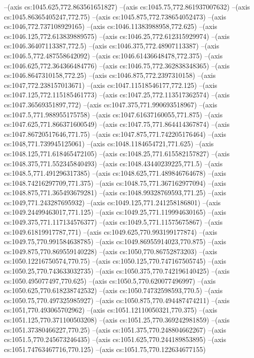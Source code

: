 --(axis cs:1045.625,772.863561651827)
--(axis cs:1045.75,772.861937007632)
--(axis cs:1045.86365405247,772.75)
--(axis cs:1045.875,772.738654052473)
--(axis cs:1046,772.737108929165)
--(axis cs:1046.11383988958,772.625)
--(axis cs:1046.125,772.613839889575)
--(axis cs:1046.25,772.612315929974)
--(axis cs:1046.36407113387,772.5)
--(axis cs:1046.375,772.48907113387)
--(axis cs:1046.5,772.487558642092)
--(axis cs:1046.61436648478,772.375)
--(axis cs:1046.625,772.364366484776)
--(axis cs:1046.75,772.362838348365)
--(axis cs:1046.8647310158,772.25)
--(axis cs:1046.875,772.2397310158)
--(axis cs:1047,772.238157013671)
--(axis cs:1047.11518546177,772.125)
--(axis cs:1047.125,772.115185461773)
--(axis cs:1047.25,772.113517362574)
--(axis cs:1047.36569351897,772)
--(axis cs:1047.375,771.990693518967)
--(axis cs:1047.5,771.988955175758)
--(axis cs:1047.61637160055,771.875)
--(axis cs:1047.625,771.866371600549)
--(axis cs:1047.75,771.864414367874)
--(axis cs:1047.86720517646,771.75)
--(axis cs:1047.875,771.742205176464)
--(axis cs:1048,771.739945125061)
--(axis cs:1048.1184654721,771.625)
--(axis cs:1048.125,771.618465472105)
--(axis cs:1048.25,771.615582157827)
--(axis cs:1048.375,771.552345840493)
--(axis cs:1048.43440239225,771.5)
--(axis cs:1048.5,771.491296317385)
--(axis cs:1048.625,771.489846764678)
--(axis cs:1048.74216297709,771.375)
--(axis cs:1048.75,771.367162977094)
--(axis cs:1048.875,771.365493679281)
--(axis cs:1048.99328769593,771.25)
--(axis cs:1049,771.243287695932)
--(axis cs:1049.125,771.241258186801)
--(axis cs:1049.24499463017,771.125)
--(axis cs:1049.25,771.119994630165)
--(axis cs:1049.375,771.117134576377)
--(axis cs:1049.5,771.11575675867)
--(axis cs:1049.61819917787,771)
--(axis cs:1049.625,770.993199177874)
--(axis cs:1049.75,770.991584638785)
--(axis cs:1049.86955914023,770.875)
--(axis cs:1049.875,770.869559140228)
--(axis cs:1050,770.86752873203)
--(axis cs:1050.12216750574,770.75)
--(axis cs:1050.125,770.747167505745)
--(axis cs:1050.25,770.743633032735)
--(axis cs:1050.375,770.742196140425)
--(axis cs:1050.495077497,770.625)
--(axis cs:1050.5,770.620077496997)
--(axis cs:1050.625,770.618238742532)
--(axis cs:1050.74732598593,770.5)
--(axis cs:1050.75,770.497325985927)
--(axis cs:1050.875,770.494487474211)
--(axis cs:1051,770.493065702962)
--(axis cs:1051.12110050321,770.375)
--(axis cs:1051.125,770.371100503208)
--(axis cs:1051.25,770.369242981859)
--(axis cs:1051.37380466227,770.25)
--(axis cs:1051.375,770.248804662267)
--(axis cs:1051.5,770.245673246435)
--(axis cs:1051.625,770.244189853895)
--(axis cs:1051.74763467716,770.125)
--(axis cs:1051.75,770.122634677155)
